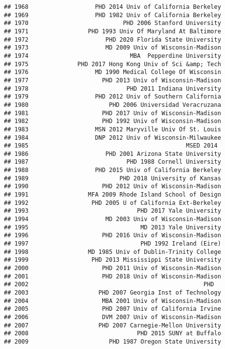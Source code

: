 \documentclass[
]{article}
\begin{document}
\begin{verbatim}
## 1968                   PHD 2014 Univ of California Berkeley
## 1969                   PHD 1982 Univ of California Berkeley
## 1970                           PHD 2006 Stanford University
## 1971                 PHD 1993 Univ Of Maryland At Baltimore
## 1972                      PHD 2020 Florida State University
## 1973                      MD 2009 Univ of Wisconsin-Madison
## 1974                             MBA  Pepperdine University
## 1975              PHD 2017 Hong Kong Univ of Sci &amp; Tech
## 1976                   MD 1990 Medical College Of Wisconsin
## 1977                     PHD 2013 Univ of Wisconsin-Madison
## 1978                            PHD 2011 Indiana University
## 1979                   PHD 2012 Univ of Southern California
## 1980                       PHD 2006 Universidad Veracruzana
## 1981                     PHD 2017 Univ of Wisconsin-Madison
## 1982                     PHD 1992 Univ of Wisconsin-Madison
## 1983                   MSN 2012 Maryville Univ Of St. Louis
## 1984                   DNP 2012 Univ of Wisconsin-Milwaukee
## 1985                                             MSED 2014 
## 1986                      PHD 2001 Arizona State University
## 1987                            PHD 1988 Cornell University
## 1988                   PHD 2015 Univ of California Berkeley
## 1989                          PHD 2018 University of Kansas
## 1990                     PHD 2012 Univ of Wisconsin-Madison
## 1991                 MFA 2009 Rhode Island School of Design
## 1992                  PHD 2005 U of California Ext-Berkeley
## 1993                               PHD 2017 Yale University
## 1994                      MD 2003 Univ of Wisconsin-Madison
## 1995                                MD 2013 Yale University
## 1996                     PHD 2016 Univ of Wisconsin-Madison
## 1997                                PHD 1992 Ireland (Eire)
## 1998                 MD 1985 Univ of Dublin-Trinity College
## 1999                  PHD 2013 Mississippi State University
## 2000                     PHD 2011 Univ of Wisconsin-Madison
## 2001                     PHD 2018 Univ of Wisconsin-Madison
## 2002                                                  PHD  
## 2003                    PHD 2007 Georgia Inst of Technology
## 2004                     MBA 2001 Univ of Wisconsin-Madison
## 2005                     PHD 2007 Univ of California Irvine
## 2006                     DVM 2007 Univ of Wisconsin-Madison
## 2007                    PHD 2007 Carnegie-Mellon University
## 2008                               PHD 2015 SUNY at Buffalo
## 2009                       PHD 1987 Oregon State University

\end{verbatim}
\end{document}
